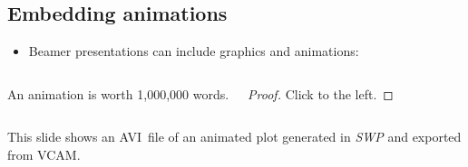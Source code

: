 \documentclass[notes=show,beamer]{beamer}
\begin{document}
\subsection{Embedding animations}

\begin{frame}%


\begin{itemize}
\item Beamer presentations can include graphics and animations:\bigskip
\end{itemize}

\begin{columns}[5cm]%

\column{5cm}%

%

\column{5cm}%

\begin{theorem}
An animation is worth 1,000,000 words.
\end{theorem}

\begin{proof}
Click to the left.
\end{proof}

\end{columns}%
\bigskip

{\scriptsize This slide shows an AVI\ file of an animated plot generated in 
\textsl{SWP }and exported from VCAM.}

\transboxout%
\end{frame}%
\end{document}
